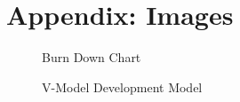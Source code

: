 \documentclass[12pt]{article}
\begin{document}
\section{Appendix: Images}
\begin{figure}[H]
\centering	
{}
\caption{Burn Down Chart}
\end{figure}


\begin{figure}[H]
\centering	
{}
\caption{V-Model Development Model}
\end{figure}
\end{document}
